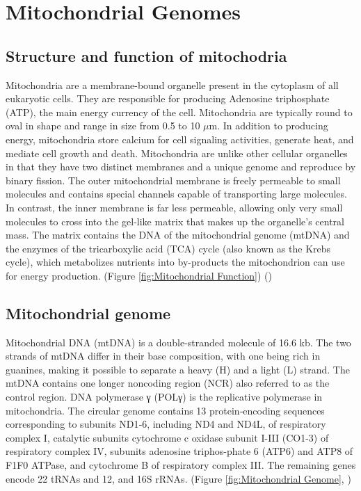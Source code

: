 \section{Mitochondrial Genomes}
\subsection{Structure and function of mitochodria}
Mitochondria are a membrane-bound organelle present in the cytoplasm of all eukaryotic cells. They are responsible for producing Adenosine triphosphate (ATP), the main energy currency of the cell.
Mitochondria are typically round to oval in shape and range in size from 0.5 to 10 $\mu$m. In addition to producing energy, mitochondria store calcium for cell signaling activities, generate heat, and mediate cell growth and death.
Mitochondria are unlike other cellular organelles in that they have two distinct membranes and a unique genome and reproduce by binary fission. 
The outer mitochondrial membrane is freely permeable to small molecules and contains special channels capable of transporting large molecules. 
In contrast, the inner membrane is far less permeable, allowing only very small molecules to cross into the gel-like matrix that makes up the organelle’s central mass. 
The matrix contains the DNA of the mitochondrial genome (mtDNA) and the enzymes of the tricarboxylic acid (TCA) cycle (also known as the Krebs cycle), which metabolizes nutrients into by-products the mitochondrion can use for energy production. (Figure \ref{fig:Mitochondrial Function}) (\cite{friedman2014mitochondrial})

\subsection{Mitochondrial genome}
Mitochondrial DNA (mtDNA) is a double-stranded molecule of 16.6 kb. The two strands of mtDNA differ in their base composition, with one being rich in guanines, making it possible to separate a heavy (H) and a light (L) strand. The mtDNA contains one longer noncoding region (NCR) also referred to as the control region. DNA polymerase γ (POLγ) is the replicative polymerase in mitochondria. 
The circular genome contains 13 protein‐encoding sequences corresponding to subunits ND1‐6, including ND4 and ND4L, of respiratory complex I, catalytic subunits cytochrome c oxidase subunit I-III (CO1-3) of respiratory complex IV, subunits adenosine triphos-phate 6 (ATP6) and ATP8 of F1F0 ATPase, and cytochrome B of respiratory complex III. 
The remaining genes encode 22 tRNAs and 12, and 16S rRNAs. (Figure \ref{fig:Mitochondrial Genome}, \cite{stefano2016mitochondrial, garone2018mitochondrial})\\

